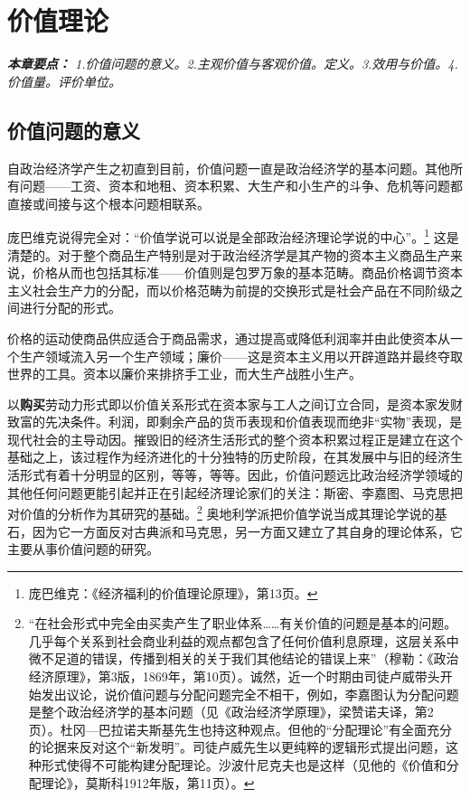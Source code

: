 \documentclass[fontset=fandol, a4paper, 12pt, openright]{ctexbook}
\renewenvironment{quote}
  {\list{}{\rightmargin\leftmargin}%
   \item\relax\small\itshape\color{darkgray}}
  {\endlist}
\begin{document}

\chapter{价值理论}

\begin{quote}
\small
\textbf{本章要点：} 1.价值问题的意义。2.主观价值与客观价值。定义。3.效用与价值。4.价值量。评价单位。
\end{quote}

\section{价值问题的意义}

自政治经济学产生之初直到目前，价值问题一直是政治经济学的基本问题。其他所有问题——工资、资本和地租、资本积累、大生产和小生产的斗争、危机等问题都直接或间接与这个根本问题相联系。

庞巴维克说得完全对：“价值学说可以说是全部政治经济理论学说的中心”。\footnote{庞巴维克：《经济福利的价值理论原理》，第13页。} 这是清楚的。对于整个商品生产特别是对于政治经济学是其产物的资本主义商品生产来说，价格从而也包括其标准——价值则是包罗万象的基本范畴。商品价格调节资本主义社会生产力的分配，而以价格范畴为前提的交换形式是社会产品在不同阶级之间进行分配的形式。

价格的运动使商品供应适合于商品需求，通过提高或降低利润率并由此使资本从一个生产领域流入另一个生产领域；廉价——这是资本主义用以开辟道路并最终夺取世界的工具。资本以廉价来排挤手工业，而大生产战胜小生产。

以\textbf{购买}劳动力形式即以价值关系形式在资本家与工人之间订立合同，是资本家发财致富的先决条件。利润，即剩余产品的货币表现和价值表现而绝非“实物”表现，是现代社会的主导动因。摧毁旧的经济生活形式的整个资本积累过程正是建立在这个基础之上，该过程作为经济进化的十分独特的历史阶段，在其发展中与旧的经济生活形式有着十分明显的区别，等等，等等。因此，价值问题远比政治经济学领域的其他任何问题更能引起并正在引起经济理论家们的关注：斯密、李嘉图、马克思把对价值的分析作为其研究的基础。\footnote{“在社会形式中完全由买卖产生了职业体系……有关价值的问题是基本的问题。几乎每个关系到社会商业利益的观点都包含了任何价值利息原理，这层关系中微不足道的错误，传播到相关的关于我们其他结论的错误上来”（穆勒：《政治经济原理》，第3版，1869年，第10页）。诚然，近一个时期由司徒卢威带头开始发出议论，说价值问题与分配问题完全不相干，例如，李嘉图认为分配问题是整个政治经济学的基本问题（见《政治经济学原理》，梁赞诺夫译，第2页）。杜冈—巴拉诺夫斯基先生也持这种观点。但他的“分配理论”有全面充分的论据来反对这个“新发明”。司徒卢威先生以更纯粹的逻辑形式提出问题，这种形式使得不可能构建分配理论。沙波什尼克夫也是这样（见他的《价值和分配理论》，莫斯科1912年版，第11页）。} 奥地利学派把价值学说当成其理论学说的基石，因为它一方面反对古典派和马克思，另一方面又建立了其自身的理论体系，它主要从事价值问题的研究。
\end{document}
